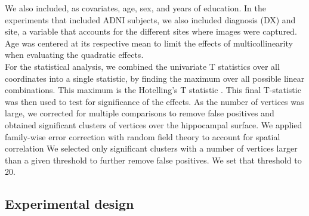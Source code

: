 \begin{table}[htbp]
\centering
{}
\caption[APOE allele pair counts.]{APOE allele pair counts for the studied cohorts. HE: heterozygotes. HO: homozygotes.}\label{table:apoeallele}
\end{table}

We also included, as covariates, age, sex, and years of education. In the experiments that included ADNI subjects, we also included diagnosis (DX) and site, a variable that accounts for the different sites where images were captured. Age was centered at its respective mean to limit the effects of multicollinearity when evaluating the quadratic effects. \\

For the statistical analysis, we combined the univariate T statistics over all coordinates into a single statistic, by finding the maximum over all possible linear combinations. This maximum is the Hotelling's T statistic \cite{Hotelling2007}. This final T-statistic was then used to test for significance of the effects. As the number of vertices was large, we corrected for multiple comparisons to remove false positives and obtained significant clusters of vertices over the hippocampal surface. We applied family-wise error correction with random field theory to account for spatial correlation \cite{Hayasaka2004} We selected only significant clusters with a number of vertices larger than a given threshold to further remove false positives. We set that threshold to 20. \\

\subsection{Experimental design}
\label{subsec:exp}

